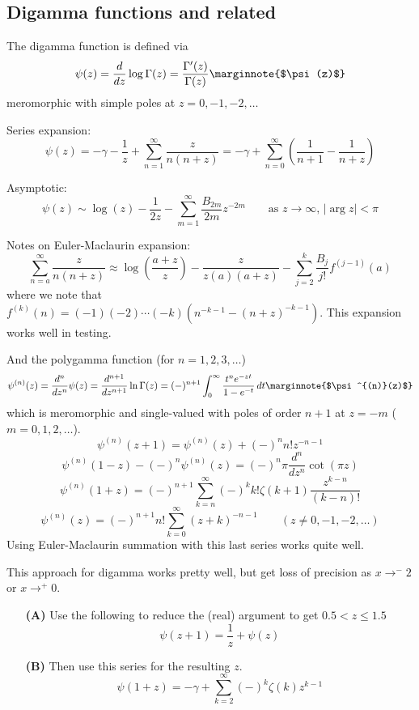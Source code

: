 \documentclass[10pt,dvipdfmx,letterpaper,twoside]{article}
\newenvironment{implementation}{\noindent\begin{framed}}{\end{framed}}
\let\DEF=\marginnote
\let\gam=\gamma
\let\Gam=\Gamma
\begin{document}
\subsection{Digamma functions and related}
The digamma function is defined via
\[ \psi(z) = \frac{d}{dz}\log\Gam(z) = \frac{\Gam'(z)}{\Gam(z)}   \DEF{$\psi(z)$}\]
meromorphic with simple poles at $z=0,-1,-2,\dots$

Series expansion:
\[ \psi(z) = -\gam - \frac1z + \sum_{n=1}^\infty\frac{z}{n(n+z)} = -\gam+\sum_{n=0}^\infty\left(\frac{1}{n+1}-\frac{1}{n+z}\right) \]

Asymptotic:
\[ \psi(z) \sim \log(z) - \frac{1}{2z} - \sum_{m=1}^\infty \frac{B_{2m}}{2m} z^{-2m} \qquad\text{as $z\to\infty$, $|\arg z|<\pi$} \]

Notes on Euler-Maclaurin expansion:
\[ \sum_{n=a}^\infty \frac{z}{n(n+z)} \approx \log(\frac{a+z}{z}) - \frac{z}{z(a)(a+z)} - \sum_{j=2}^k \frac{B_j}{j!} f^{(j-1)}(a) \]
where we note that $f^{(k)}(n) = (-1)(-2)\cdots(-k)(n^{-k-1}-(n+z)^{-k-1})$.  This expansion works well in testing.

And the polygamma function (for $n=1,2,3,\dots$)
\[ \psi^{(n)}(z) = \frac{d^n}{dz^n}\psi(z) = \frac{d^{n+1}}{dz^{n+1}}\ln\Gam(z)
    = (-)^{n+1}\int_0^\infty\frac{t^n e^{-zt}}{1-e^{-t}}\,dt \DEF{$\psi^{(n)}(z)$}\]
which is meromorphic and single-valued with poles of order $n+1$ at $z=-m$ ($m=0,1,2,\dots$).
\[ \psi^{(n)}(z+1) = \psi^{(n)}(z) + (-)^n n! z^{-n-1} \]
\[ \psi^{(n)}(1-z) - (-)^n\psi^{(n)}(z) = (-)^n \pi \frac{d^n}{dz^n}\cot(\pi z) \]
\[ \psi^{(n)}(1+z) = (-)^{n+1}\sum_{k=n}^\infty (-)^k k!\zeta(k+1)\frac{z^{k-n}}{(k-n)!} \]
\[ \psi^{(n)}(z) = (-)^{n+1} n! \sum_{k=0}^\infty (z+k)^{-n-1} \qquad(z\neq0,-1,-2,\dots) \]
Using Euler-Maclaurin summation with this last series works quite well.

\begin{implementation}
This approach for digamma works pretty well, but get loss of precision as $x\to^-2$ or $x\to^+0$.
\begin{itemize}
\item[\bf(A)] Use the following to reduce the (real) argument to get $0.5<z\leq1.5$
    \[ \psi(z+1) = \frac{1}{z} + \psi(z) \]
\item[\bf(B)] Then use this series for the resulting $z$.
    \[ \psi(1+z) = -\gamma + \sum_{k=2}^\infty (-)^k \zeta(k) z^{k-1} \]
\end{itemize}
\end{implementation}
\end{document}
